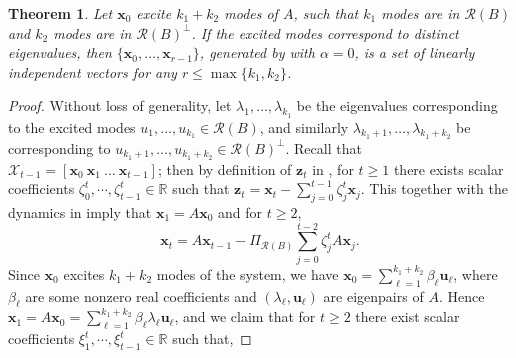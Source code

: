 \documentclass[journal]{IEEEtran}
\newtheorem{theorem}{Theorem}
\theoremstyle{definition}
\theoremstyle{remark}
\newcommand\x{{\bm x}}
\def\u{{\bm u}}
\newcommand\z{{\bm z}}
\begin{document}

\begin{theorem}
    \label{thm:linIndp}
    Let $\x_0$ excite $k_1+k_2$ modes of $A$, such that $k_1$ modes are in $\mathcal{R}(B)$ and $k_2$ modes are in $\mathcal{R}(B)^\perp$.
    If the excited modes correspond to distinct eigenvalues, then  $\{\x_0,\dots,\x_{r-1}\}$, generated by  with $\alpha = 0$, is a set of linearly independent vectors for any $r \leq \max\{k_1,k_2\}$.
\end{theorem}

\begin{proof}
    Without loss of generality, let $\lambda_1,\dots, \lambda_{k_1}$ be the eigenvalues corresponding to the excited modes $u_1, \dots, u_{k_1} \in \mathcal{R}(B)$, and similarly $\lambda_{k_1+1},\dots, \lambda_{k_1+k_2}$ be corresponding to $u_{k_1+1}, \dots, u_{k_1+k_2} \in \mathcal{R}(B)^\perp$.
    Recall that $\mathcal{X}_{t-1} = [\x_0\ \x_1\ \dots\ \x_{t-1}]$; then by definition of $\z_t$ in , for $t\geq 1$ there exists scalar coefficients $ \zeta^t_{0}, \cdots, \zeta^t_{t-1} \in \mathbb{R}$ such that $\z_t = \x_t - \sum_{j=0}^{t-1} \zeta_j^t \x_j$.  This together with the dynamics in  imply that $\x_1 = A \x_0$ and for $t\geq 2$,
    \begin{equation}\label{eqn:xt-proof}
         \textstyle \x_{t}=  A \x_{t-1}  -  \Pi_{\mathcal{R}(B)} \sum_{j=0}^{t-2} \zeta_j^t A \x_j.
    \end{equation}
    Since $\x_0$ excites $k_1+k_2$ modes of the system, we have $\x_0 = \sum_{\ell=1}^{k_1+k_2} \beta_\ell \u_\ell$, where $\beta_\ell$ are some nonzero real coefficients and $(\lambda_\ell,\u_\ell)$ are eigenpairs of $A$.
    Hence $\x_1 = A \x_0 = \sum_{\ell=1}^{k_1+k_2} \beta_\ell \lambda_\ell \u_\ell$, and we claim that for $t \geq 2$ there exist scalar coefficients $ \xi^t_{1}, \cdots, \xi^t_{t-1} \in \mathbb{R}$ such that,

\end{proof}
\end{document}
